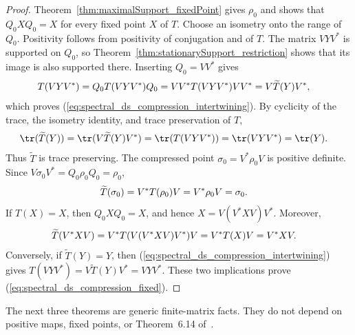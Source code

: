 \begin{proof}
    \leanok
    Theorem~\ref{thm:maximalSupport_fixedPoint} gives $\rho_0$ and shows
    that $Q_0XQ_0=X$ for every fixed point $X$ of $T$. Choose an isometry
    onto the range of $Q_0$. Positivity follows from positivity of
    conjugation and of $T$. The matrix $VYV^*$ is supported on $Q_0$, so
    Theorem~\ref{thm:stationarySupport_restriction} shows that its image is
    also supported there. Inserting $Q_0=VV^*$ gives
    \begin{align}
        T(VYV^*)
         & =Q_0T(VYV^*)Q_0
        =VV^*T(VYV^*)VV^*
        =V\widetilde T(Y)V^*,
        \notag
    \end{align}
    which proves (\ref{eq:spectral_ds_compression_intertwining}). By
    cyclicity of the trace, the isometry identity, and trace preservation of
    $T$,
    \begin{align}
        \tr(\widetilde T(Y))
         & =\tr(V\widetilde T(Y)V^*)
        =\tr(T(VYV^*))
        =\tr(VYV^*)
        =\tr(Y).
        \notag
    \end{align}
    Thus $\widetilde T$ is trace preserving. The compressed point
    $\sigma_0=V^*\rho_0V$ is positive definite. Since
    $V\sigma_0V^*=Q_0\rho_0Q_0=\rho_0$,
    \begin{align}
        \widetilde T(\sigma_0)
         & =V^*T(\rho_0)V
        =V^*\rho_0V
        =\sigma_0.
        \notag
    \end{align}
    If $T(X)=X$, then $Q_0XQ_0=X$, and hence
    $X=V(V^*XV)V^*$. Moreover,
    \begin{align}
        \widetilde T(V^*XV)
         & =V^*T(V(V^*XV)V^*)V
        =V^*T(X)V
        =V^*XV.
        \notag
    \end{align}
    Conversely, if $\widetilde T(Y)=Y$, then
    (\ref{eq:spectral_ds_compression_intertwining}) gives
    $T(VYV^*)=V\widetilde T(Y)V^*=VYV^*$. These two implications prove
    (\ref{eq:spectral_ds_compression_fixed}).
\end{proof}

The next three theorems are generic finite-matrix facts. They do not depend
on positive maps, fixed points, or Theorem~6.14 of~\cite{Wolf2012Quantum}.
